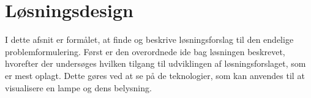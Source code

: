 \clearpage
\section{Løsningsdesign}
I dette afsnit er formålet, at finde og beskrive løsningsforslag til den endelige problemformulering. Først er den overordnede ide bag løsningen beskrevet, hvorefter der undersøges hvilken tilgang til udviklingen af løsningsforslaget, som er mest oplagt. Dette gøres ved at se på de teknologier, som kan anvendes til at visualisere en lampe og dens belysning.





\clearpage